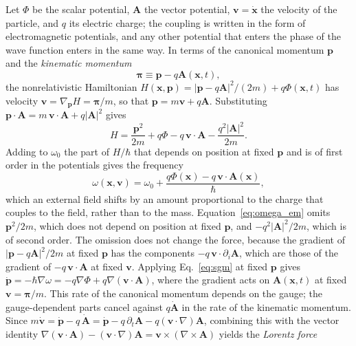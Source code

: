 \documentclass[aps,prd,onecolumn,tightenlines,nofootinbib,notitlepage,11pt,floatfix]{revtex4-2}
\theoremstyle{indentedtheorem}
\begin{document}
Let $\Phi$ be the scalar potential, $\mathbf{A}$ the vector potential, $\mathbf{v}=\dot{\mathbf{x}}$ the velocity of the particle, and $q$ its electric charge; the coupling is written in the form of electromagnetic potentials, and any other potential that enters the phase of the wave function enters in the same way. In terms of the canonical momentum $\mathbf{p}$ and the \emph{kinematic momentum}
\begin{equation}
    \boldsymbol{\pi} \equiv \mathbf{p} - q\mathbf{A}(\mathbf{x},t) ,
    \label{eq:kinematic_momentum}
\end{equation}
the nonrelativistic Hamiltonian $H(\mathbf{x},\mathbf{p}) = |\mathbf{p}-q\mathbf{A}|^2/(2m) + q\Phi(\mathbf{x},t)$ has velocity $\mathbf{v} = \nabla_{\mathbf{p}}H = \boldsymbol{\pi}/m$, so that $\mathbf{p} = m\mathbf{v} + q\mathbf{A}$. Substituting $\mathbf{p}\cdot\mathbf{A} = m\,\mathbf{v}\cdot\mathbf{A} + q|\mathbf{A}|^2$ gives
\begin{equation}
    H = \frac{\mathbf{p}^2}{2m} + q\Phi - q\,\mathbf{v}\cdot\mathbf{A} - \frac{q^2|\mathbf{A}|^2}{2m} .
    \label{eq:H_split_v}
\end{equation}
Adding to $\omega_0$ the part of $H/\hbar$ that depends on position at fixed $\mathbf{p}$ and is of first order in the potentials gives the frequency
\begin{equation}
    \omega(\mathbf{x},\mathbf{v}) = \omega_0 + \frac{q\Phi(\mathbf{x}) - q\,\mathbf{v}\cdot\mathbf{A}(\mathbf{x})}{\hbar} ,
    \label{eq:omega_em}
\end{equation}
which an external field shifts by an amount proportional to the charge that couples to the field, rather than to the mass. Equation~\eqref{eq:omega_em} omits $\mathbf{p}^2/2m$, which does not depend on position at fixed $\mathbf{p}$, and $-q^2|\mathbf{A}|^2/2m$, which is of second order. The omission does not change the force, because the gradient of $|\mathbf{p}-q\mathbf{A}|^2/2m$ at fixed $\mathbf{p}$ has the components $-q\,\mathbf{v}\cdot\partial_i\mathbf{A}$, which are those of the gradient of $-q\,\mathbf{v}\cdot\mathbf{A}$ at fixed $\mathbf{v}$. Applying Eq.~\eqref{eq:sgm} at fixed $\mathbf{p}$ gives $\dot{\mathbf{p}} = -\hbar\nabla\omega = -q\nabla\Phi + q\nabla(\mathbf{v}\cdot\mathbf{A})$, where the gradient acts on $\mathbf{A}(\mathbf{x},t)$ at fixed $\mathbf{v}=\boldsymbol{\pi}/m$. This rate of the canonical momentum depends on the gauge; the gauge-dependent parts cancel against $q\dot{\mathbf{A}}$ in the rate of the kinematic momentum. Since $m\dot{\mathbf{v}} = \dot{\mathbf{p}} - q\,\dot{\mathbf{A}} = \dot{\mathbf{p}} - q\,\partial_t\mathbf{A} - q(\mathbf{v}\cdot\nabla)\mathbf{A}$, combining this with the vector identity $\nabla(\mathbf{v}\cdot\mathbf{A}) - (\mathbf{v}\cdot\nabla)\mathbf{A} = \mathbf{v}\times(\nabla\times\mathbf{A})$ yields the \emph{Lorentz force}~\citep{Lorentz1895Electrodynamics,Jackson1999Classical}
\end{document}
